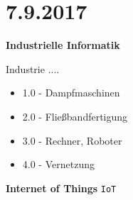 
\section{7.9.2017}
\textbf{Industrielle Informatik}

Industrie ....

\begin{itemize}
	\item 1.0 - Dampfmaschinen
	\item 2.0 - Fließbandfertigung
	\item 3.0 - Rechner, Roboter
	\item 4.0 - Vernetzung
\end{itemize}



\textbf{Internet of Things} \verb|IoT|


